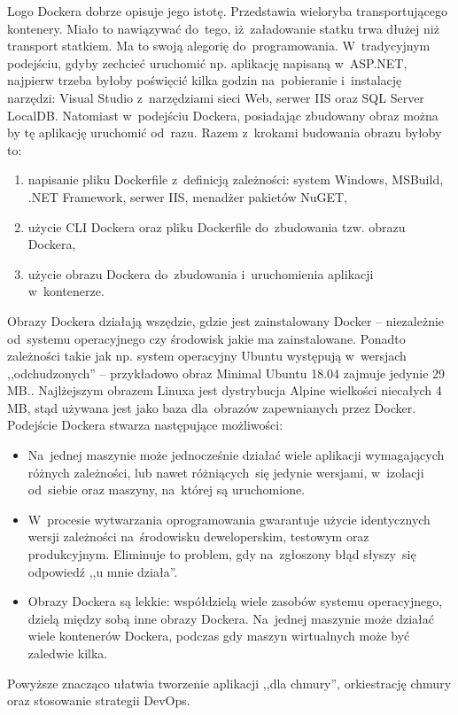 \documentclass[12pt,a4paper,twoside,titlepage,openright]{book}
\begin{document}
Logo Dockera dobrze opisuje jego istotę. Przedstawia wieloryba transportującego kontenery. Miało to nawiązywać do~tego, iż~załadowanie statku trwa dłużej niż transport statkiem. Ma to swoją alegorię do~programowania. W~tradycyjnym podejściu, gdyby zechcieć uruchomić np. aplikację napisaną w~ASP.NET, najpierw trzeba byłoby poświęcić kilka godzin na~pobieranie i~instalację narzędzi: Visual Studio z~narzędziami sieci Web, serwer IIS oraz SQL Server LocalDB. Natomiast w~podejściu Dockera, posiadając zbudowany obraz można by tę aplikację uruchomić od~razu. Razem z~krokami budowania obrazu byłoby to:
\begin{enumerate}
\item napisanie pliku Dockerfile z~definicją zależności: system Windows, MSBuild, .NET Framework, serwer IIS, menadżer pakietów NuGET,
\item użycie CLI Dockera oraz pliku Dockerfile do~zbudowania tzw. obrazu Dockera,
\item użycie obrazu Dockera do~zbudowania i~uruchomienia aplikacji w~kontenerze.
\end{enumerate}
Obrazy Dockera działają wszędzie, gdzie jest zainstalowany Docker -- niezależnie od~systemu operacyjnego czy środowisk jakie ma zainstalowane. Ponadto zależności takie jak np. system operacyjny Ubuntu występują w~wersjach ,,odchudzonych'' -- przykładowo obraz Minimal Ubuntu 18.04 zajmuje jedynie 29 MB.\cite{siteUbuntuBlog}. Najlżejszym obrazem Linuxa jest dystrybucja Alpine wielkości niecałych 4 MB, stąd używana jest jako baza dla~obrazów zapewnianych przez Docker.\cite{dockerPacktMastering}
Podejście Dockera stwarza następujące możliwości:
\begin{itemize}
\item Na~jednej maszynie może jednocześnie działać wiele aplikacji wymagających różnych zależności, lub nawet różniących~się jedynie wersjami, w~izolacji od~siebie oraz maszyny, na~której są uruchomione.
\item W~procesie wytwarzania oprogramowania gwarantuje użycie identycznych wersji zależności na~środowisku deweloperskim, testowym oraz produkcyjnym. Eliminuje to problem, gdy na~zgłoszony błąd słyszy~się odpowiedź ,,u mnie działa''.
\item Obrazy Dockera są lekkie: współdzielą wiele zasobów systemu operacyjnego, dzielą między sobą inne obrazy Dockera.\cite{siteDockerStackOverflow} Na~jednej maszynie może działać wiele kontenerów Dockera, podczas gdy maszyn wirtualnych może być zaledwie kilka.\cite{ccSpringer}
\end{itemize}
Powyższe znacząco ułatwia tworzenie aplikacji ,,dla chmury'', orkiestrację chmury oraz stosowanie strategii DevOps.
\end{document}
